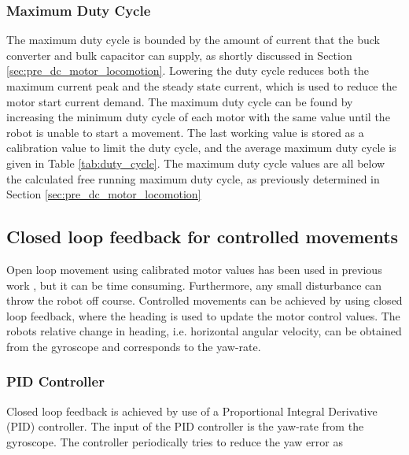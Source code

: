 \subsubsection{Maximum Duty Cycle}

The maximum duty cycle is bounded by the amount of current that the buck converter and bulk capacitor can supply, as shortly discussed in Section \ref{sec:pre_dc_motor_locomotion}.
Lowering the duty cycle reduces both the maximum current peak and the steady state current, which is used to reduce the motor start current demand.
The maximum duty cycle can be found by increasing the minimum duty cycle of each motor with the same value until the robot is unable to start a movement.
The last working value is stored as a calibration value to limit the duty cycle, and the average maximum duty cycle is given in Table \ref{tab:duty_cycle}.
The maximum duty cycle values are all below the calculated free running maximum duty cycle, as previously determined in Section \ref{sec:pre_dc_motor_locomotion}


\subsection{Closed loop feedback for controlled movements}

Open loop movement using calibrated motor values has been used in previous work \cite{legoc_uist_2016}, but it can be time consuming.
Furthermore, any small disturbance can throw the robot off course.
Controlled movements can be achieved by using closed loop feedback, where the heading is used to update the motor control values.
The robots relative change in heading, i.e. horizontal angular velocity, can be obtained from the gyroscope and corresponds to the yaw-rate.

\subsubsection{PID Controller}


Closed loop feedback is achieved by use of a Proportional Integral Derivative (PID) controller.
The input of the PID controller is the yaw-rate from the gyroscope.
The controller periodically tries to reduce the yaw error as

